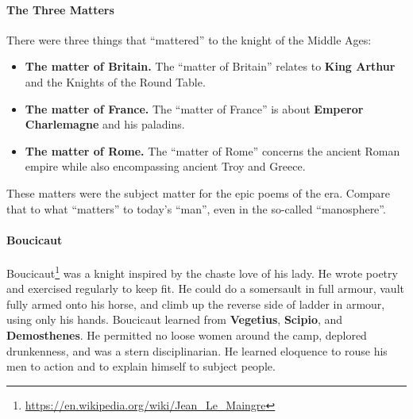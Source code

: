 \paragraph{The Three Matters}


There were three things that ``mattered'' to the knight of the Middle Ages:

\begin{itemize}


\item \textbf{The matter of Britain.} The ``matter of Britain'' relates to \textbf{King Arthur} and the Knights of the Round Table.

\item \textbf{The matter of France.} The ``matter of France'' is about \textbf{Emperor Charlemagne} and his paladins.

\item \textbf{The matter of Rome.} The ``matter of Rome'' concerns the ancient Roman empire while also encompassing ancient Troy and Greece.
\end{itemize}


These matters were the subject matter for the epic poems of the era. Compare that to what ``matters'' to today's ``man'', even in the so-called ``manosphere''.

\paragraph{Boucicaut}


Boucicaut\footnote{\url{https://en.wikipedia.org/wiki/Jean_Le_Maingre}} was a knight inspired by the chaste love of his lady. He wrote poetry and exercised regularly to keep fit. He could do a somersault in full armour, vault fully armed onto his horse, and climb up the reverse side of ladder in armour, using only his hands. Boucicaut learned from \textbf{Vegetius}, \textbf{Scipio}, and \textbf{Demosthenes}. He permitted no loose women around the camp, deplored drunkenness, and was a stern disciplinarian. He learned eloquence to rouse his men to action and to explain himself to subject people.



